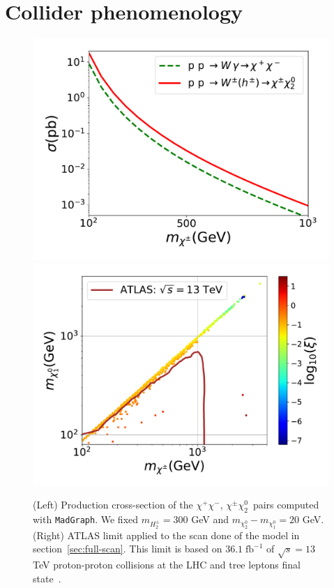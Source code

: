 \documentclass[12pt,letterpaper]{article}
\begin{document}
\section{Collider phenomenology}
\label{sec:collider}
%
\begin{figure}
\begin{center}
\includegraphics[scale=0.43]{sigma_pp_xx_MadGraph}
\includegraphics[scale=0.42]{compressed_spectra}
\caption{ (Left) Production cross-section of the $\chi^+\chi^-$, $\chi^{\pm}\chi_2^0\,$ pairs computed with \texttt{MadGraph}\cite{Alwall:2014hca}. We fixed $m_{H_2^{\pm}}=300$ GeV and $m_{\chi_2^0}-m_{\chi_1^0}=20$ GeV. (Right) ATLAS limit applied to the scan done of the model in section~\ref{sec:full-scan}. This limit is based on $36.1\; \text{fb}^{-1}$ of $\sqrt{s} = 13$ TeV proton-proton collisions at the LHC and tree leptons final state~\cite{Aaboud:2018jiw}. }
\label{fig:LHC}
\end{center}
\end{figure}
\end{document}
